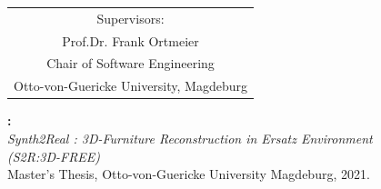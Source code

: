 \documentclass[
]{thesis}
\newcommand{\university}{Otto-von-Guericke University Magdeburg}
\newcommand{\advisorone}{Marco Filax}
\newcommand{\departmentone}{Chair of Software Engineering}
\newcommand{\universityone}{Otto-von-Guericke University, Magdeburg}
\newcommand{\advisortwo}{Konstantin Kirchheim}
\newcommand{\departmenttwo}{Chair of Software Engineering}
\newcommand{\universitytwo}{Otto-von-Guericke University, Magdeburg}
\newcommand{\supervisorone}{Prof.Dr. Frank Ortmeier}
\newcommand{\sdepartmentone}{Chair of Software Engineering}
\newcommand{\suniversityone}{Otto-von-Guericke University, Magdeburg}
\newcommand{\departmentthree}{}
\newcommand{\universitythree}{}
\newcommand{\thesiskind}{Master's Thesis}
\newcommand{\thetitle}{Synth2Real : 3D-Furniture Reconstruction in Ersatz Environment \\ (S2R:3D-FREE)}
\newcommand{\theyear}{2021}
\begin{document}
\begin{titlepage}
\begin{center}
    \begin{tabular}{c}
        {\small Supervisors:} \\[1mm]
        {\large \supervisorone}\\ %
        {\small \sdepartmentone}\\%
        {\small \suniversityone}\\%
    \end{tabular}

    \renewcommand{\arraystretch}{1}
    \end{center}
    \vspace*{\fill}
\end{titlepage}

\thispagestyle{empty}
\vspace*{\fill}
\begin{minipage}{15.0cm}
    \textbf{\theauthorrev:}\\
    \emph{\thetitle\\}
    \thesiskind, \university, \theyear.
\end{minipage}
\newpage
\end{document}
